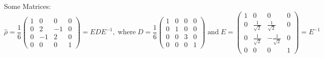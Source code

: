 \documentclass[a4paper,12pt]{article}
\begin{document}
Some Matrices:
\begin{equation}\label{eq:Diagonalisation}
    \hat{\rho} =    \frac{1}{6}
                    \begin{pmatrix}
                        1 &  0 &  0 & 0 \\
                        0 &  2 & -1 & 0 \\
                        0 & -1 &  2 & 0 \\
                        0 &  0 &  0 & 1
                    \end{pmatrix}
               =    EDE^{-1}, \; \text{where} \;
    D = \frac{1}{6}
        \begin{pmatrix}
            1 & 0 & 0 & 0 \\
            0 & 1 & 0 & 0 \\
            0 & 0 & 3 & 0 \\
            0 & 0 & 0 & 1
        \end{pmatrix} \; \text{and} \;
    E = \begin{pmatrix}
            1 &  0 &  0 & 0 \\
            0 & \frac{1}{\sqrt{2}} &  \frac{1}{\sqrt{2}} & 0 \\
            0 & \frac{1}{\sqrt{2}} & -\frac{1}{\sqrt{2}} & 0 \\
            0 &  0 &  0 & 1
        \end{pmatrix} = E^{-1}
\end{equation}


 


\begin{comment}
\addcontentsline{toc}{section}{References}
\markboth{Conclusion}{}
\printbibliography
\end{comment}
\end{document}
